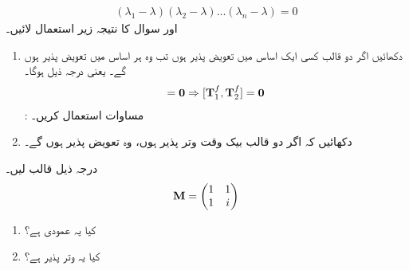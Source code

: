 \begin{align*}
	(\lambda_1-\lambda)(\lambda_2-\lambda)\dots(\lambda_n-\lambda) = 0
\end{align*}
اور سوال    کا نتیجہ زیر  استعمال  لائیں۔
\begin{enumerate}[a]
\item
دکھائیں اگر دو قالب کسی ایک اساس میں تعویض پذیر  ہوں تب وہ ہر اساس میں تعویض پذیر ہوں گے۔  یعنی درجہ ذیل ہوگا۔
\begin{align}
	[\mat{T}^e_1, \mat{T}^e_2] = \mat{0} \Rightarrow [\mat{T}^f_1, \mat{T}^f_2] = \mat{0}
\end{align}
: مساوات   استعمال کریں۔
\item
 دکھائیں کہ اگر دو قالب بیک وقت وتر پذیر ہوں، وہ  تعویض پذیر ہوں گے۔
 \end{enumerate}
درجہ ذیل قالب لیں۔
\begin{align*}
	\operatorname{\mathbf{M}}=
	\begin{pmatrix}
		1 & 1\\
		1 & i
	\end{pmatrix}
\end{align*}
\begin{enumerate}[a]
\item
 کیا یہ عمودی  ہے؟
\item
 کیا یہ وتر پذیر  ہے؟
 \end{enumerate}


